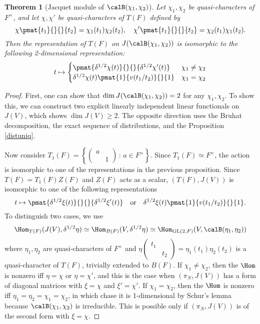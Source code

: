 \documentclass{article}
\newtheorem{theorem}{Theorem}[section]
\newcommand{\GL}{\mathrm{GL}}
\newcommand{\smat}[4]{\left(\begin{smallmatrix} #1 & #2 \\ #3 & #4 \end{smallmatrix}\right)}
\begin{document}
\begin{theorem}[Jacquet module of $\calB(\chi_1, \chi_2)$]
\label{psjac}
Let $\chi_1, \chi_2$ be quasi-characters of $F^{\times}$, and let $\chi, \chi'$ be quasi-characters of $T(F)$ defined by 
$$
\chi\pmat{t_1}{}{}{t_2} = \chi_1(t_1)\chi_2(t_2), \quad \chi'\pmat{t_1}{}{}{t_2} = \chi_2(t_1)\chi_1(t_2). 
$$
Then the representation of $T(F)$ on $J(\calB(\chi_1, \chi_2))$ is isomorphic to the following 2-dimensional representation:
\begin{align*}
t\mapsto \begin{cases} \pmat{\delta^{1/2}\chi(t)}{}{}{\delta^{1/2}\chi'(t)} & \chi_1 \neq \chi_2 \\ 
\delta^{1/2}\chi(t) \pmat{1}{v(t_1/t_2)}{}{1} & \chi_1 = \chi_2 \end{cases}
\end{align*}
\end{theorem}
\begin{proof}
First, one can show that $\dim J(\calB(\chi_1, \chi_2)) = 2$ for any $\chi_1, \chi_2$. 
To show this, we can construct two explicit linearly independent linear functionals on $J(V)$, which shows $\dim J(V) \geq 2$. The opposite direction uses the Bruhat decomposition, the exact sequence of distributions, and the Proposition \ref{distuniq}. 

Now consider $T_{1}(F) = \left\{ \smat{a}{}{}{1}\,:\, a\in F^{\times}\right\}$. Since $T_1(F)\simeq F^{\times}$, the action is isomorphic to one of the representations in the previous proposition. 
Since $T(F) = T_{1}(F)Z(F)$ and $Z(F)$ acts as a scalar, $(T(F), J(V))$ is isomorphic to one of the following representations
$$
t\mapsto \pmat{\delta^{1/2}\xi(t)}{}{}{\delta^{1/2}\xi'(t)}\quad\text{or}\quad \delta^{1/2}\xi(t)\pmat{1}{v(t_1/t_2)}{}{1}. 
$$
To distinguish two cases, we use
\begin{align*}
\Hom_{T(F)}(J(V), \delta^{1/2}\eta) \simeq \Hom_{B(F)}(V, \delta^{1/2}\eta) \simeq \Hom_{\GL(2, F)}(V, \calB(\eta_1, \eta_2))
\end{align*}
where $\eta_1, \eta_2$ are quasi-characters of $F^{\times}$ and $\eta\smat{t_1}{}{}{t_2} = \eta_1(t_1)\eta_2(t_2)$ is a quasi-character of $T(F)$, trivially extended to $B(F)$. 
If $\chi_1 \neq \chi_2$, then the $\Hom$ is nonzero iff  $\eta = \chi$ or $\eta = \chi'$, and this is the case when $(\pi_N, J(V))$ has a form of diagonal matrices with $\xi = \chi$ and $\xi' = \chi'$. 
If $\chi_1 = \chi_2$, then the $\Hom$ is nonzero iff $\eta_1 =\eta_2 = \chi_1 = \chi_2$, in which chase it is 1-dimensional by Schur's lemma because $\calB(\chi_1, \chi_2)$ is irreducible. This is possible only if $(\pi_N, J(V))$ is of the second form with $\xi = \chi$. 
\end{proof}
\end{document}
